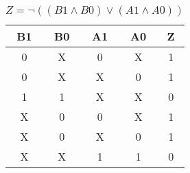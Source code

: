 
\begin{center}
    \begin{table}[h] \caption{\(Z = \lnot ((B1 \land B0) \lor (A1 \land A0)) \)}
        \begin{center}
            \begin{tabular}{|c|c|c|c||c|} \hline
            B1 & B0 & A1 & A0 & Z \\ \hline\hline
            0  & X  & 0  & X  & 1 \\ \hline
            0  & X  & X  & 0  & 1 \\ \hline
            1  & 1  & X  & X  & 0 \\ \hline
            X  & 0  & 0  & X  & 1 \\ \hline
            X  & 0  & X  & 0  & 1 \\ \hline
            X  & X  & 1  & 1  & 0 \\ \hline
            \end{tabular}
        \end{center}
    \end{table}
\end{center}
